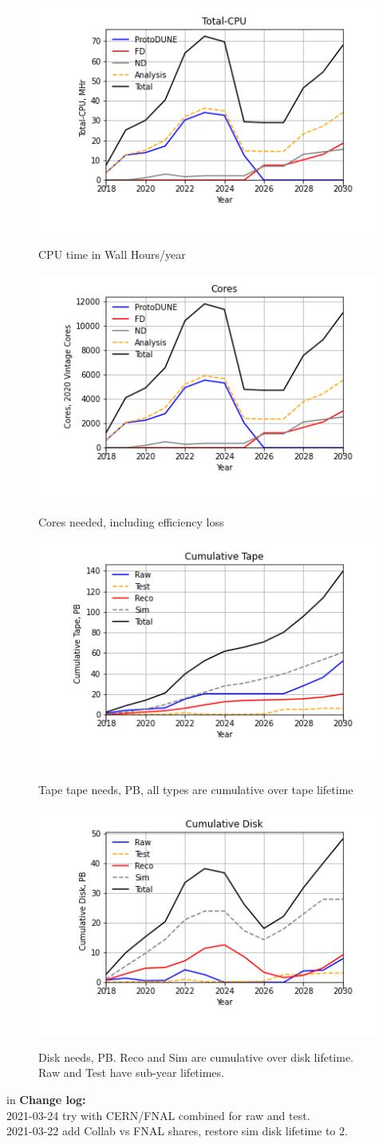 \documentclass[12pt]{article}
\begin{document}
\pagebreak\begin{figure}
\centering\includegraphics[height=0.4\textwidth]{Total-CPU.png}\label{TotalCPU}
\caption{CPU time in Wall Hours/year}
\end{figure}
\begin{figure}
\centering\includegraphics[height=0.4\textwidth]{Cores.png}\label{Cores}
\caption{Cores needed, including efficiency loss}
\end{figure}
\begin{figure}
\centering\includegraphics[height=0.4\textwidth]{Cumulative-Tape.png}\label{CumulativeTape}
\caption{Tape tape needs, PB, all types are cumulative over tape lifetime}
\end{figure}
\begin{figure}
\centering\includegraphics[height=0.4\textwidth]{Cumulative-Disk}\label{CumulativeDisk}
\caption{Disk needs, PB.  Reco and Sim are cumulative over disk lifetime.  Raw and Test have sub-year lifetimes.}
\end{figure}
 in\pagebreak 
 {\bf Change log:}\\
2021-03-24 try with CERN/FNAL combined for raw and test.\\2021-03-22 add Collab vs FNAL shares, restore sim disk lifetime to 2.\\
\end{document}
